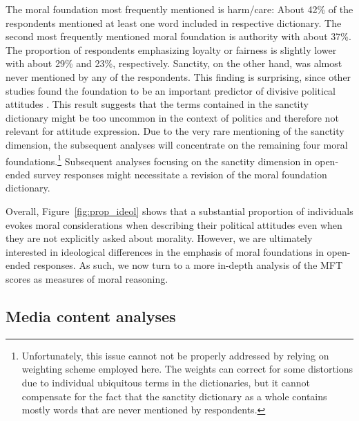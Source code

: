\documentclass[12pt]{article}
\begin{document}
The moral foundation most frequently mentioned is harm/care: About 42\% of the respondents mentioned at least one word included in respective dictionary. The second most frequently mentioned moral foundation is authority with about 37\%. The proportion of respondents emphasizing loyalty or fairness is slightly lower with about 29\% and 23\%, respectively. Sanctity, on the other hand, was almost never mentioned by any of the respondents. This finding is surprising, since other studies found the foundation to be an important predictor of divisive political attitudes \citep{koleva2012tracing}. This result suggests that the terms contained in the sanctity dictionary might be too uncommon in the context of politics and therefore not relevant for attitude expression. Due to the very rare mentioning of the sanctity dimension, the subsequent analyses will concentrate on the remaining four moral foundations.\footnote{Unfortunately, this issue cannot not be properly addressed by relying on weighting scheme employed here. The weights can correct for some distortions due to individual ubiquitous terms in the dictionaries, but it cannot compensate for the fact that the sanctity dictionary as a whole contains mostly words that are never mentioned by respondents.} Subsequent analyses focusing on the sanctity dimension in open-ended survey responses might necessitate a revision of the moral foundation dictionary.

Overall, Figure~\ref{fig:prop_ideol} shows that a substantial proportion of individuals evokes moral considerations when describing their political attitudes even when they are not explicitly asked about morality. However, we are ultimately interested in ideological differences in the emphasis of moral foundations in open-ended responses. As such, we now turn to a more in-depth analysis of the MFT scores as measures of moral reasoning.


\subsection{Media content analyses}
\end{document}
